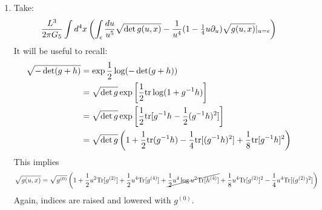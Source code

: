 \documentclass[11pt, class=article, crop=false]{standalone}
\begin{document}
\begin{enumerate}
	\item Take:
	\begin{equation}\label{eq:gravonshell}
				\frac{L^3}{2 \pi G_5} \int d^4 x\left( \int_{\epsilon} \frac{du}{u^5} \sqrt{\det g(u, x)} - \frac{1}{u^4} (1 - \tfrac14 u \partial_u) \sqrt{g(u, x)}|_{u = \epsilon} \right)
	\end{equation}
	It will be useful to recall:
	\[
	\begin{aligned}
				\sqrt{-\det(g+h)}& = \exp \frac12 \log (-\det(g+h))\\& = \sqrt{\det g} \exp\left[ \frac12 \mathrm{tr} \log(1 + g^{-1} h) \right] \\&= \sqrt{\det g} \exp\left[ \frac12 \mathrm{tr} [g^{-1} h - \frac12 (g^{-1} h)^2] \right]\\& = \sqrt{\det g}\left(1 + \frac12 \mathrm{tr} (g^{-1} h) - \frac14 \mathrm{tr}[(g^{-1} h)^2] + \frac18 \mathrm{tr}[g^{-1} h]^2 \right)
	\end{aligned}
	\]
	This implies
	\[
		\sqrt{g(u, x)} = \sqrt{g^{(0)}} \left(1 + \frac12 u^2 \mathrm{Tr}[g^{(2)}] + \frac12 u^4 \mathrm{Tr}[g^{(4)}] + \cancel{ \frac12 u^4 \log u^2 \mathrm{Tr}[h^{(4)}]} + \frac18 u^4 \mathrm{Tr}[g^{(2)}]^2  - \frac14 u^4 \mathrm{Tr}[(g^{(2)})^2 ] \right)
	\]
	Again, indices are raised and lowered with $g^{(0)}$.
	

\end{enumerate}
\end{document}
